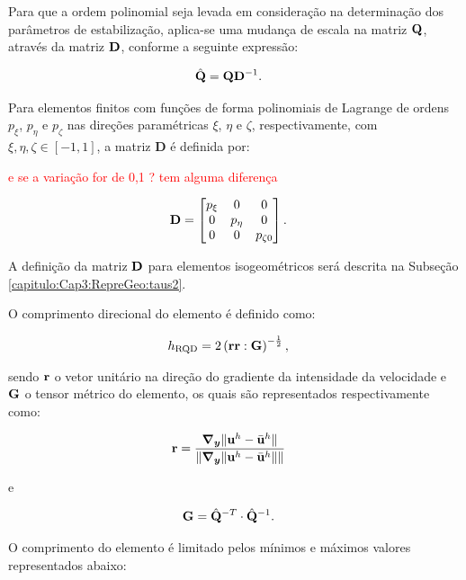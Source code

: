 \documentclass[tese_patricia]{subfiles}%
\begin{document}
Para que a ordem polinomial seja levada em consideração na determinação dos parâmetros de estabilização, aplica-se uma mudança de escala na matriz $\mathbf{Q}$, através da matriz $\mathbf{D}$, conforme a seguinte expressão:

\begin{align}
	\hat{\mathbf{Q}}&=\mathbf{Q}\mathbf{D}^{-1}.
\end{align}

Para elementos finitos com funções de forma polinomiais de Lagrange de ordens $p_\xi$, $p_\eta$ e $p_\zeta$ nas direções paramétricas $\xi$, $\eta$ e $\zeta$, respectivamente, com $\xi, \eta, \zeta \in [-1, 1]$, a matriz $\mathbf{D}$ é definida por:


\textcolor{red}{e se a variação for de 0,1 ? tem alguma diferença}

\begin{align}
	\mathbf{D}&=\begin{bmatrix}
		p_{\xi} & 0 & 0\\
		0 & p_{\eta} & 0 \\
		0 & 0 & p_{\zeta0}
	\end{bmatrix}.
\end{align}

A definição da matriz $\mathbf{D}$ para elementos isogeométricos será descrita na Subseção \ref{capitulo:Cap3:RepreGeo:taus2}.

O comprimento direcional do elemento é definido como:

\begin{align}
	h_{\mathrm{RQD}} &=2\left(\mathbf{r}\mathbf{r} : \mathbf{G} \right)^{-\frac{1}{2}},
\end{align}

\noindent sendo $\mathbf{r}$ o vetor unitário na direção do gradiente da intensidade da velocidade e $\mathbf{G}$ o tensor métrico do elemento, os quais são representados respectivamente como:

\begin{align}
	\mathbf{r}&=\frac{\boldsymbol{\nabla_y} \lVert\mathbf{u}^h - \bar{\mathbf{u}}^h\rVert}{\lVert \boldsymbol{\nabla_y} \lVert\mathbf{u}^h - \bar{\mathbf{u}}^h\rVert\rVert} \label{eq:rRGN}
\end{align}

\noindent e

\begin{align}
	\mathbf{G} &= \hat{\mathbf{Q}}^{-T} \cdot \hat{\mathbf{Q}}^{-1}. 
\end{align}

O comprimento do elemento é limitado pelos mínimos e máximos valores representados abaixo:
\end{document}
